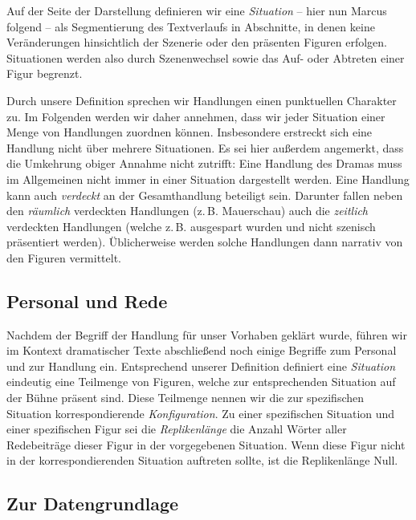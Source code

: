 \documentclass[a4paper,10pt,abstract=true,headings=small]{scrartcl}
\begin{document}
Auf der Seite der Darstellung definieren wir eine \emph{Situation} – hier nun Marcus folgend – als Segmentierung des Textverlaufs in Abschnitte, in denen keine Veränderungen hinsichtlich der Szenerie oder den präsenten Figuren erfolgen.
Situationen werden also durch Szenenwechsel sowie das Auf- oder Abtreten einer Figur begrenzt.\autocite[Vgl.][140]{marcus_mathematisch-linguistisches_1971} %

Durch unsere Definition sprechen wir Handlungen einen punktuellen Charakter zu.
Im Folgenden werden wir daher annehmen, dass wir jeder Situation einer Menge von Handlungen zuordnen können.
Insbesondere erstreckt sich eine Handlung nicht über mehrere Situationen. 
Es sei hier außerdem angemerkt, dass die Umkehrung obiger Annahme nicht zutrifft: Eine Handlung des Dramas muss im Allgemeinen nicht immer in einer Situation dargestellt werden.
Eine Handlung kann auch \emph{verdeckt} an der Gesamthandlung beteiligt sein.
Darunter fallen neben den \emph{räumlich} verdeckten Handlungen (z.\,B. Mauerschau) auch die \emph{zeitlich} verdeckten Handlungen (welche z.\,B. ausgespart wurden und nicht szenisch präsentiert werden).
Üblicherweise werden solche Handlungen dann narrativ von den Figuren vermittelt.\autocite[Vgl.][276]{pfister_drama:_2001}

\subsection{Personal und Rede}\label{sec:personal}

Nachdem der Begriff der Handlung für unser Vorhaben geklärt wurde, führen wir im Kontext dramatischer Texte abschließend noch einige Begriffe zum Personal und zur Handlung ein.
Entsprechend unserer Definition definiert eine \emph{Situation} eindeutig eine Teilmenge von Figuren, welche zur entsprechenden Situation auf der Bühne präsent sind.
Diese Teilmenge nennen wir die zur spezifischen Situation korrespondierende \emph{Konfiguration}.\autocite[Vgl.][235]{pfister_drama:_2001}
Zu einer spezifischen Situation und einer spezifischen Figur sei die \emph{Replikenlänge} die Anzahl Wörter aller Redebeiträge dieser Figur in der vorgegebenen Situation.
Wenn diese Figur nicht in der korrespondierenden Situation auftreten sollte, ist die Replikenlänge Null.


\subsection{Zur Datengrundlage}\label{sec:daten}
\end{document}
